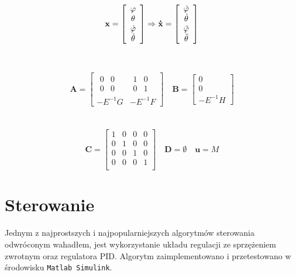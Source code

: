 $$
\mathbf{x} =
\left[ \begin{array}{c}
\varphi \\
\theta \\
\dot{\varphi} \\
\dot{\theta}
\end{array} \right]
\Rightarrow
\mathbf{\dot{x}} =
\left[ \begin{array}{c}
\dot{\varphi} \\
\dot{\theta} \\
\Ddot{\varphi} \\
\Ddot{\theta}
\end{array} \right]
$$
\\ \\
$$
\mathbf{A} =
\left[ \begin{array}{c|ccc}
\begin{array}{cc}
0 & 0 \\
0 & 0
\end{array}
& 
\begin{array}{cc}
1 & 0 \\
0 & 1
\end{array} \\
\hline
-E^{-1}G & -E^{-1}F
\end{array} \right] 
\quad
\mathbf{B} =
\left[ \begin{array}{c}
0 \\
0 \\
-E^{-1}H
\end{array} \right] 
$$
\\ \\
$$
\mathbf{C} =
\left[ \begin{array}{cccc}
1 & 0 & 0 & 0 \\
0 & 1 & 0 & 0 \\
0 & 0 & 1 & 0 \\
0 & 0 & 0 & 1 \\
\end{array} \right] 
\quad
\mathbf{D} = \emptyset
\quad
\mathbf{u} = M
$$

\newpage

\section{Sterowanie}
\label{Sterowanie podrozdzial}
Jednym z najprostszych i najpopularniejszych algorytmów sterowania odwróconym wahadłem, jest wykorzystanie układu regulacji ze sprzężeniem zwrotnym oraz regulatora PID. Algorytm zaimplementowano i przetestowano w środowisku \texttt{Matlab Simulink}.

